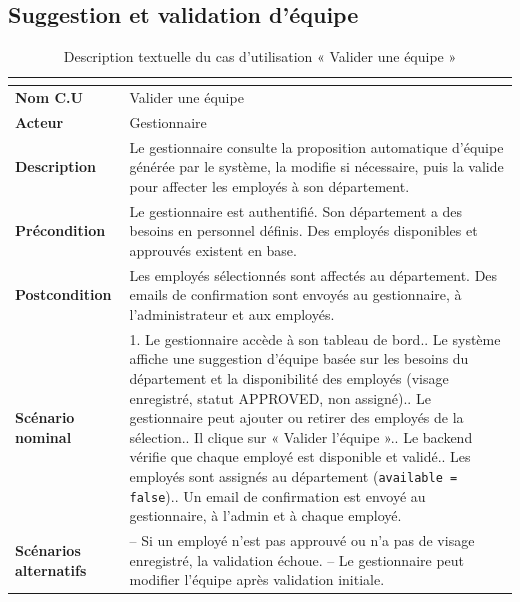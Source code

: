 
\subsection{Suggestion et validation d'équipe}

\begin{table}[H]
  \centering
  \caption{Description textuelle du cas d'utilisation « Valider une équipe »}
  \label{tab:cu_team}
  \renewcommand{\arraystretch}{1.4}
  \begin{tabularx}{\textwidth}{|>{\bfseries}l|L|}
    \hline
     \\
    \hline
    Nom C.U & Valider une équipe \\
    \hline
    Acteur & Gestionnaire \\
    \hline
    Description & Le gestionnaire consulte la proposition automatique d'équipe générée
      par le système, la modifie si nécessaire, puis la valide pour affecter les employés
      à son département. \\
    \hline
    Précondition & Le gestionnaire est authentifié. Son département a des besoins en
      personnel définis. Des employés disponibles et approuvés existent en base. \\
    \hline
    Postcondition & Les employés sélectionnés sont affectés au département. Des emails
      de confirmation sont envoyés au gestionnaire, à l'administrateur et aux employés. \\
    \hline
    Scénario nominal &
      1. Le gestionnaire accède à son tableau de bord.. Le système affiche une suggestion d'équipe basée sur les besoins du département
         et la disponibilité des employés (visage enregistré, statut APPROVED, non assigné).. Le gestionnaire peut ajouter ou retirer des employés de la sélection.. Il clique sur « Valider l'équipe ».. Le backend vérifie que chaque employé est disponible et validé.. Les employés sont assignés au département (\texttt{available = false}).. Un email de confirmation est envoyé au gestionnaire, à l'admin et à chaque employé. \\
    \hline
    Scénarios alternatifs &
      -- Si un employé n'est pas approuvé ou n'a pas de visage enregistré, la validation échoue.\newline
      -- Le gestionnaire peut modifier l'équipe après validation initiale. \\
    \hline
  \end{tabularx}
\end{table}

